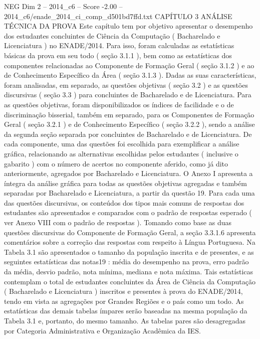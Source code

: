 \begin{textsample}{NEG Dim 2 – 2014\_c6 – Score -2.00 – 2014\_c6/enade\_2014\_ci\_comp\_d501bd7ffd.txt}  \label{ex:f2_neg_207}
CAPÍTULO 3 ANÁLISE TÉCNICA DA PROVA Este capítulo tem por objetivo apresentar o desempenho dos estudantes concluintes de Ciência da Computação ( Bacharelado e Licenciatura ) no ENADE/2014.
Para isso, foram calculadas as estatísticas básicas da prova em seu todo ( seção 3.1.1 ), bem como as estatísticas dos componentes relacionadas ao Componente de Formação Geral ( seção 3.1.2 ) e ao de Conhecimento Específico da Área ( seção 3.1.3 ).
Dadas as suas características, foram analisadas, em separado, as questões objetivas ( seção 3.2 ) e as questões discursivas ( seção 3.3 ) para concluintes de Bacharelado e de Licenciatura.
Para as questões objetivas, foram disponibilizados os índices de facilidade e o de discriminação bisserial, também em separado, para os Componentes de Formação Geral ( seção 3.2.1 ) e de Conhecimento Específico ( seção 3.2.2 ), sendo a análise da segunda seção separada por concluintes de Bacharelado e de Licenciatura.
De cada componente, uma das questões foi escolhida para exemplificar a análise gráfica, relacionando as alternativas escolhidas pelos estudantes ( inclusive o gabarito ) com o número de acertos no componente aferido, como já dito anteriormente, agregados por Bacharelado e Licenciatura.
O Anexo I apresenta a íntegra da análise gráfica para todas as questões objetivas agregadas e também separadas por Bacharelado e Licenciatura, a partir da questão 19.
Para cada uma das questões discursivas, os conteúdos dos tipos mais comuns de respostas dos estudantes são apresentados e comparados com o padrão de respostas esperado ( ver Anexo VIII com o padrão de respostas ).
Tomando como base as duas questões discursivas do Componente de Formação Geral, a seção 3.3.1.6 apresenta comentários sobre a correção das respostas com respeito à Língua Portuguesa.
Na Tabela 3.1 são apresentados o tamanho da população inscrita e de presentes, e as seguintes estatísticas das notas19 : média do desempenho na prova, erro padrão da média, desvio padrão, nota mínima, mediana e nota máxima.
Tais estatísticas contemplam o total de estudantes concluintes da Área de Ciência da Computação ( Bacharelado e Licenciatura ) inscritos e presentes à prova do ENADE/2014, tendo em vista as agregações por Grandes Regiões e o país como um todo.
As estatísticas das demais tabelas ímpares serão baseadas na mesma população da Tabela 3.1 e, portanto, do mesmo tamanho.
As tabelas pares são desagregadas por Categoria Administrativa e Organização Acadêmica da IES.

\end{textsample}

